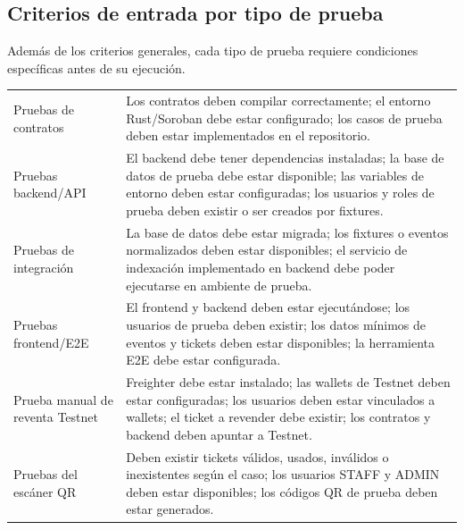 \documentclass[12pt,letterpaper]{article}
\begin{document}
\subsection{Criterios de entrada por tipo de prueba}

Además de los criterios generales, cada tipo de prueba requiere condiciones específicas antes de su ejecución.

\begin{table}[H]
\centering
\begingroup
\scriptsize
\setlength{\tabcolsep}{3pt}
\renewcommand{\arraystretch}{1.22}

\begin{tabularx}{\textwidth}{|
>{\raggedright\arraybackslash}p{3.7cm}|
>{\raggedright\arraybackslash}X|}
\hline
\multicolumn{1}{|>{\centering\arraybackslash}m{3.7cm}|}{\textbf{Tipo de prueba}} &
\multicolumn{1}{>{\centering\arraybackslash}m{10.6cm}|}{\textbf{Criterios de entrada}} \\
\hline

Pruebas de contratos &
Los contratos deben compilar correctamente; el entorno Rust/Soroban debe estar configurado; los casos de prueba deben estar implementados en el repositorio. \\
\hline

Pruebas backend/API &
El backend debe tener dependencias instaladas; la base de datos de prueba debe estar disponible; las variables de entorno deben estar configuradas; los usuarios y roles de prueba deben existir o ser creados por fixtures. \\
\hline

Pruebas de integración &
La base de datos debe estar migrada; los fixtures o eventos normalizados deben estar disponibles; el servicio de indexación implementado en backend debe poder ejecutarse en ambiente de prueba. \\
\hline

Pruebas frontend/E2E &
El frontend y backend deben estar ejecutándose; los usuarios de prueba deben existir; los datos mínimos de eventos y tickets deben estar disponibles; la herramienta E2E debe estar configurada. \\
\hline

Prueba manual de reventa Testnet &
Freighter debe estar instalado; las wallets de Testnet deben estar configuradas; los usuarios deben estar vinculados a wallets; el ticket a revender debe existir; los contratos y backend deben apuntar a Testnet. \\
\hline

Pruebas del escáner QR &
Deben existir tickets válidos, usados, inválidos o inexistentes según el caso; los usuarios STAFF y ADMIN deben estar disponibles; los códigos QR de prueba deben estar generados. \\
\hline


\end{tabularx}
\end{table}
\end{document}
